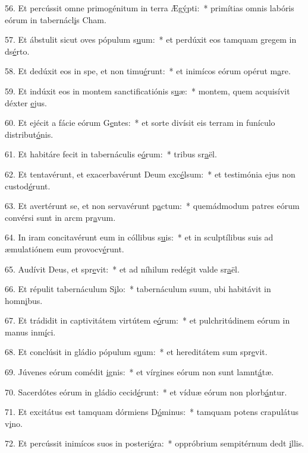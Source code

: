 56. Et percússit omne primogénitum in terra Æg\uline{ý}pti:~* primítias omnis labóris eórum in tabernácl\uline{i}s Cham.\par 
57. Et ábstulit sicut oves pópulum s\uline{u}um:~* et perdúxit eos tamquam gregem in ds\uline{é}rto.\par 
58. Et dedúxit eos in spe, et non timu\uline{é}runt:~* et inimícos eórum opérut m\uline{a}re.\par 
59. Et indúxit eos in montem sanctificatiónis s\uline{u}æ:~* montem, quem acquisívit déxter \uline{e}jus.\par 
60. Et ejécit a fácie eórum G\uline{e}ntes:~* et sorte divísit eis terram in funículo distribut\uline{ó}nis.\par 
61. Et habitáre fecit in tabernáculis e\uline{ó}rum:~* tribus sr\uline{a}ël.\par 
62. Et tentavérunt, et exacerbavérunt Deum exc\uline{é}lsum:~* et testimónia ejus non custod\uline{é}runt.\par 
63. Et avertérunt se, et non servavérunt p\uline{a}ctum:~* quemádmodum patres eórum convérsi sunt in arcm pr\uline{a}vum.\par 
64. In iram concitavérunt eum in cóllibus s\uline{u}is:~* et in sculptílibus suis ad æmulatiónem eum provocv\uline{é}runt.\par 
65. Audívit Deus, et spr\uline{e}vit:~* et ad níhilum redégit valde sr\uline{a}ël.\par 
66. Et répulit tabernáculum S\uline{i}lo:~* tabernáculum suum, ubi habitávit in homn\uline{i}bus.\par 
67. Et trádidit in captivitátem virtútem e\uline{ó}rum:~* et pulchritúdinem eórum in manus inm\uline{í}ci.\par 
68. Et conclúsit in gládio pópulum s\uline{u}um:~* et hereditátem sum spr\uline{e}vit.\par 
69. Júvenes eórum comédit \uline{i}gnis:~* et vírgines eórum non sunt lamnt\uline{á}tæ.\par 
70. Sacerdótes eórum in gládio cecid\uline{é}runt:~* et víduæ eórum non plorb\uline{á}ntur.\par 
71. Et excitátus est tamquam dórmiens D\uline{ó}minus:~* tamquam potens crapulátus  v\uline{i}no.\par 
72. Et percússit inimícos suos in posteri\uline{ó}ra:~* oppróbrium sempitérnum dedt \uline{i}llis.\par 
